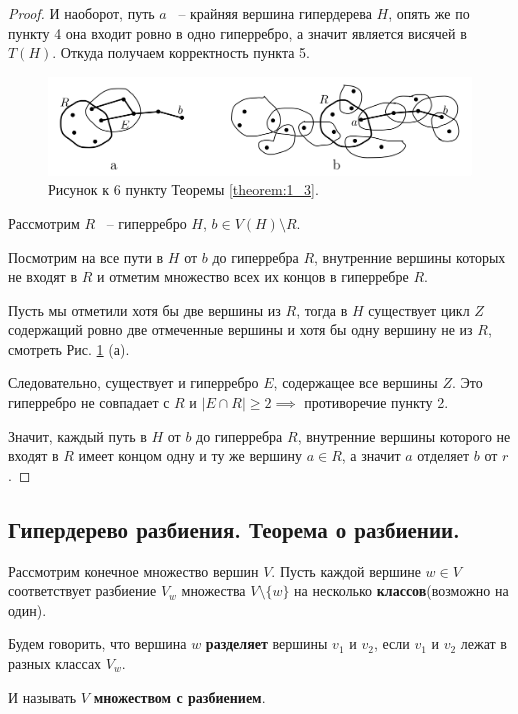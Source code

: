 \documentclass[../main.tex]{subfiles}
\begin{document}
\begin{proof}
	И наоборот, путь $a$ ~-- крайняя вершина гипердерева $H$, опять же по пункту 4 она входит ровно в одно гиперребро, а значит является висячей в $T(H)$.
	Откуда получаем корректность пункта 5.

\begin{figure}[ht]
    \centering
	\includegraphics[width=0.6\columnwidth]{figures/theorem_1_3.png}
	\caption{Рисунок к 6 пункту Теоремы \ref{theorem:1_3}.}
    \label{fig:theorem_1_3}
\end{figure}

	Рассмотрим $R$ ~-- гиперребро $H$, $b \in V(H) \setminus R$.

	Посмотрим на все пути в $H$ от $b$ до гиперребра $R$, внутренние вершины которых не входят в $R$ и отметим множество всех их концов в гиперребре $R$.

	Пусть мы отметили хотя бы две вершины из  $R$, тогда в $H$ существует цикл $Z$ содержащий ровно две отмеченные вершины и хотя бы одну вершину не из $R$, смотреть Рис. \ref{fig:theorem_1_3} (а).

	Следовательно, существует и гиперребро $E$, содержащее все вершины $Z$.
	Это гиперребро не совпадает с  $R$ и  $|E \cap R| \geqslant 2 \implies $ противоречие пункту 2.

	Значит, каждый путь в  $H$ от $b$ до гиперребра $R$, внутренние вершины которого не входят в $R$ имеет концом одну и ту же вершину $a \in R$, а значит  $a$ отделяет $b$ от  $r$.
 \end{proof}

\subsection{Гипердерево разбиения. Теорема о разбиении.}

\begin{df*}
	Рассмотрим конечное множество вершин $V$. Пусть каждой вершине $w \in V$ соответствует разбиение $V_w$ множества $V \setminus \{w\}$ на несколько \textbf{классов}(возможно на один).

	Будем говорить, что вершина $w$ \textbf{разделяет} вершины $v_1$ и $v_2$, если $v_1$ и $v_2$ лежат в разных классах $V_w$.

	И называть  $V$ \textbf{множеством с разбиением}.
\end{df*}
\end{document}
